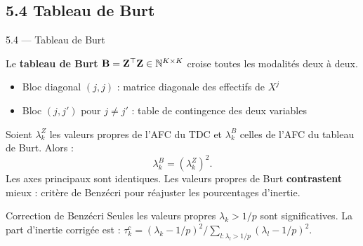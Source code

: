 \subsection{5.4 Tableau de Burt}
\begin{frame}{5.4 — Tableau de Burt}
\begin{definition}
Le \textbf{tableau de Burt} $\mathbf{B} = \mathbf{Z}^\top \mathbf{Z} \in \mathbb{N}^{K \times K}$
croise toutes les modalités deux à deux.
\begin{itemize}
  \item Bloc diagonal $(j,j)$ : matrice diagonale des effectifs de $X^j$
  \item Bloc $(j,j')$ pour $j \neq j'$ : table de contingence des deux variables
\end{itemize}
\end{definition}

\begin{theorem}
Soient $\lambda_k^{Z}$ les valeurs propres de l'AFC du TDC et $\lambda_k^{B}$
celles de l'AFC du tableau de Burt. Alors :
\[
\lambda_k^{B} = (\lambda_k^{Z})^2.
\]
Les axes principaux sont identiques. Les valeurs propres de Burt
\textbf{contrastent} mieux : critère de \alert{Benzécri} pour réajuster les
pourcentages d'inertie.
\end{theorem}

\begin{block}{Correction de Benzécri}
\small Seules les valeurs propres $\lambda_k > 1/p$ sont significatives.
La part d'inertie corrigée est :
$\tau_k^{c} = (\lambda_k - 1/p)^2 / \sum_{l : \lambda_l > 1/p} (\lambda_l - 1/p)^2$.
\end{block}
\end{frame}

